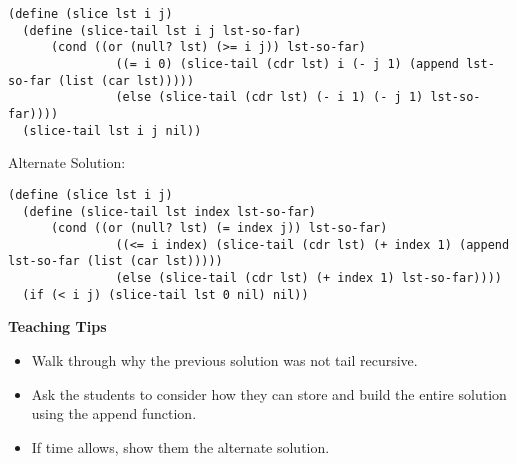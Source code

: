 \begin{solution}
\begin{blocksection}
\begin{lstlisting}
(define (slice lst i j)
  (define (slice-tail lst i j lst-so-far)
      (cond ((or (null? lst) (>= i j)) lst-so-far)
               ((= i 0) (slice-tail (cdr lst) i (- j 1) (append lst-so-far (list (car lst)))))
               (else (slice-tail (cdr lst) (- i 1) (- j 1) lst-so-far))))
  (slice-tail lst i j nil))
\end{lstlisting}
Alternate Solution:
\begin{lstlisting}
(define (slice lst i j)
  (define (slice-tail lst index lst-so-far)
      (cond ((or (null? lst) (= index j)) lst-so-far)
               ((<= i index) (slice-tail (cdr lst) (+ index 1) (append lst-so-far (list (car lst)))))
               (else (slice-tail (cdr lst) (+ index 1) lst-so-far))))
  (if (< i j) (slice-tail lst 0 nil) nil))
\end{lstlisting}
\end{blocksection}
\end{solution}


\begin{guide}
\begin{blocksection}
\textbf{Teaching Tips}
\begin{itemize}
	\item Walk through why the previous solution was not tail recursive.
	\item Ask the students to consider how they can store and build the entire solution using the append function.
	\item If time allows, show them the alternate solution.
\end{itemize}
\end{blocksection}
\end{guide}
